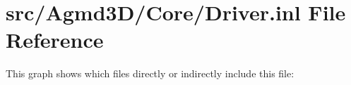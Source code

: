 \hypertarget{_driver_8inl}{\section{src/\+Agmd3\+D/\+Core/\+Driver.inl File Reference}
\label{_driver_8inl}
}
This graph shows which files directly or indirectly include this file\+:
